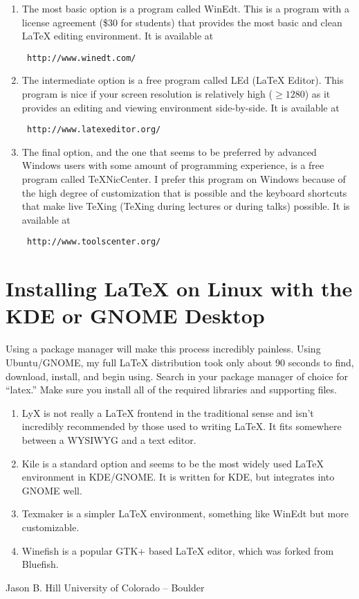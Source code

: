 \documentclass{article}
\begin{document}
\begin{enumerate}
 \item The most basic option is a program called WinEdt. This is a program with a license agreement (\$30 for students) that provides the most basic and clean LaTeX editing environment. It is available at 
\begin{verbatim}
 http://www.winedt.com/
\end{verbatim}
\item The intermediate option is a free program called LEd (LaTeX Editor). This program is nice if your screen resolution is relatively high ($\ge1280$) as it provides an editing and viewing environment side-by-side. It is available at
\begin{verbatim}
 http://www.latexeditor.org/
\end{verbatim}
\item The final option, and the one that seems to be preferred by advanced Windows users with some amount of programming experience, is a free program called TeXNicCenter. I prefer this program on Windows because of the high degree of customization that is possible and the keyboard shortcuts that make live TeXing (TeXing during lectures or during talks) possible. It is available at
\begin{verbatim}
 http://www.toolscenter.org/
\end{verbatim}

\end{enumerate}


\section{Installing LaTeX on Linux with the KDE or GNOME Desktop}

Using a package manager will make this process incredibly painless. Using Ubuntu/GNOME, my full LaTeX distribution took only about 90 seconds to find, download, install, and begin using. Search in your package manager of choice for ``latex.'' Make sure you install all of the required libraries and supporting files.

\begin{enumerate}
 \item LyX is not really a LaTeX frontend in the traditional sense and isn't incredibly recommended by those used to writing LaTeX. It fits somewhere between a WYSIWYG and a text editor.
 \item Kile is a standard option and seems to be the most widely used LaTeX environment in KDE/GNOME. It is written for KDE, but integrates into GNOME well.
 \item Texmaker is a simpler LaTeX environment, something like WinEdt but more customizable.
 \item Winefish is a popular GTK+ based LaTeX editor, which was forked from Bluefish.
\end{enumerate}



\vspace{4pc}
\hfill Jason B. Hill
\smallbreak\hfill University of Colorado -- Boulder
\end{document}
